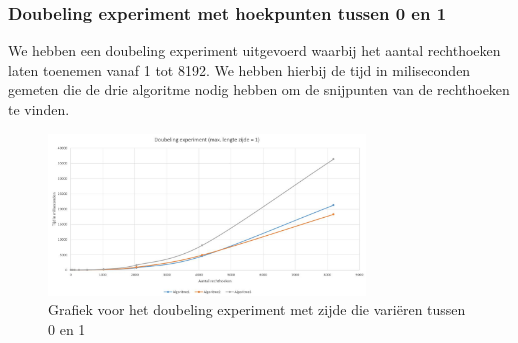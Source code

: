 \documentclass[11pt,a4paper,titlepage]{article}
\begin{document}
			\subsubsection{Doubeling experiment met hoekpunten tussen 0 en 1}
				We hebben een doubeling experiment uitgevoerd waarbij het aantal rechthoeken laten toenemen vanaf 1 tot 8192.  We hebben hierbij de tijd in miliseconden gemeten die de drie algoritme nodig hebben om de snijpunten van de rechthoeken te vinden.
				\begin{figure}[H]
				\centering
				\includegraphics[width=0.75\textwidth]{zijde1.JPG}
				\caption{\label{fig:convR}Grafiek voor het doubeling experiment met zijde die variëren tussen 0 en 1}
				\end{figure}
\end{document}

